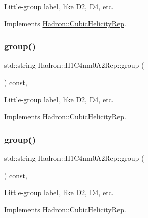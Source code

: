 Little-\/group label, like D2, D4, etc. 

Implements \mbox{\hyperlink{structHadron_1_1CubicHelicityRep_a101a7d76cd8ccdad0f272db44b766113}{Hadron\+::\+Cubic\+Helicity\+Rep}}.

\mbox{\label{structHadron_1_1H1C4nm0A2Rep_a3033103082fad0b1572469c929fde9bb}} 
\subsubsection{\texorpdfstring{group()}{group()}\hspace{0.1cm}{\footnotesize\ttfamily [3/5]}}
{\footnotesize\ttfamily std\+::string Hadron\+::\+H1\+C4nm0\+A2\+Rep\+::group (\begin{DoxyParamCaption}{ }\end{DoxyParamCaption}) const\hspace{0.3cm}{\ttfamily [inline]}, {\ttfamily [virtual]}}

Little-\/group label, like D2, D4, etc. 

Implements \mbox{\hyperlink{structHadron_1_1CubicHelicityRep_a101a7d76cd8ccdad0f272db44b766113}{Hadron\+::\+Cubic\+Helicity\+Rep}}.

\mbox{\label{structHadron_1_1H1C4nm0A2Rep_a3033103082fad0b1572469c929fde9bb}} 
\subsubsection{\texorpdfstring{group()}{group()}\hspace{0.1cm}{\footnotesize\ttfamily [4/5]}}
{\footnotesize\ttfamily std\+::string Hadron\+::\+H1\+C4nm0\+A2\+Rep\+::group (\begin{DoxyParamCaption}{ }\end{DoxyParamCaption}) const\hspace{0.3cm}{\ttfamily [inline]}, {\ttfamily [virtual]}}

Little-\/group label, like D2, D4, etc. 

Implements \mbox{\hyperlink{structHadron_1_1CubicHelicityRep_a101a7d76cd8ccdad0f272db44b766113}{Hadron\+::\+Cubic\+Helicity\+Rep}}.

